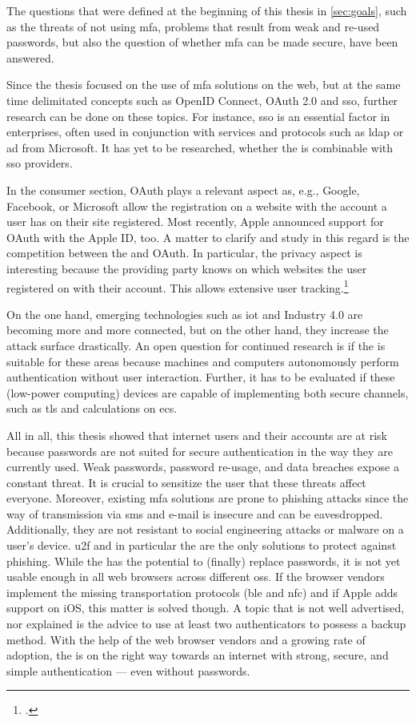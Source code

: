 The questions that were defined at the beginning of this thesis in \autoref{sec:goals}, such as the threats of not using \gls{mfa}, problems that result from weak and re-used passwords, but also the question of whether \gls{mfa} can be made secure, have been answered.

Since the thesis focused on the use of \gls{mfa} solutions on the web, but at the same time delimitated concepts such as OpenID Connect, OAuth 2.0 and \gls{sso}, further research can be done on these topics. For instance, \gls{sso} is an essential factor in enterprises, often used in conjunction with services and protocols such as \gls{ldap} or \gls{ad} from Microsoft. It has yet to be researched, whether the \wa{} is combinable with \gls{sso} providers.

In the consumer section, OAuth plays a relevant aspect as, e.g., Google, Facebook, or Microsoft allow the registration on a website with the account a user has on their site registered. Most recently, Apple announced support for OAuth with the Apple ID, too. A matter to clarify and study in this regard is the competition between the \wa{} and OAuth. In particular, the privacy aspect is interesting because the providing party knows on which websites the user registered on with their account. This allows extensive user tracking.\footcites[See][18]{fido-ct-2}[See][4]{osti_1257179}

On the one hand, emerging technologies such as \gls{iot} and Industry 4.0 are becoming more and more connected, but on the other hand, they increase the attack surface drastically. An open question for continued research is if the \wa{} is suitable for these areas because machines and computers autonomously perform authentication without user interaction. Further, it has to be evaluated if these (low-power computing) devices are capable of implementing both secure channels, such as \gls{tls} and calculations on \glspl{ec}.

All in all, this thesis showed that internet users and their accounts are at risk because passwords are not suited for secure authentication in the way they are currently used. Weak passwords, password re-usage, and data breaches expose a constant threat. It is crucial to sensitize the user that these threats affect everyone. Moreover, existing \gls{mfa} solutions are prone to phishing attacks since the way of transmission via \gls{sms} and e-mail is insecure and can be eavesdropped. Additionally, they are not resistant to social engineering attacks or malware on a user's device. \gls{u2f} and in particular the \wa{} are the only solutions to protect against phishing. While the \wa{} has the potential to (finally) replace passwords, it is not yet usable enough in all web browsers across different \glspl{os}. If the browser vendors implement the missing transportation protocols (\gls{ble} and \gls{nfc}) and if Apple adds support on iOS, this matter is solved though. A topic that is not well advertised, nor explained is the advice to use at least two authenticators to possess a backup method. With the help of the web browser vendors and a growing rate of adoption, the \wa{} is on the right way towards an internet with strong, secure, and simple authentication --- even without passwords.
